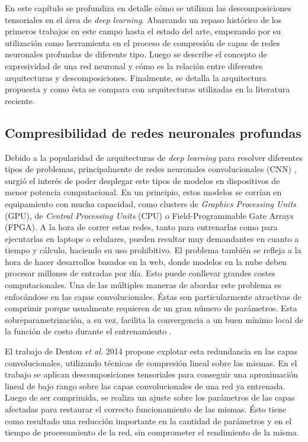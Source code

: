 \documentclass[spanish]{article}
\theoremstyle{definition}
\theoremstyle{remark}
\numberwithin{equation}{section}
\numberwithin{equation}{section} %
\begin{document}
\vspace*{0.25in}
\normalsize En este capítulo se profundiza en detalle cómo se utilizan las descomposiciones tensoriales en el área de \textit{deep learning}. Abarcando un repaso histórico de los primeros trabajos en este campo hasta el estado del arte, empezando por su utilización como herramienta en el proceso de compresión de capas de redes neuronales profundas de diferente tipo. Luego se describe el concepto de expresividad de una red neuronal y cómo es la relación entre diferentes arquitecturas y descomposiciones. Finalmente, se detalla la arquitectura propuesta y como ésta se compara con arquitecturas utilizadas en la literatura reciente.           
\par





\clearpage

\subsection{Compresibilidad de redes neuronales profundas}

Debido a la popularidad de arquitecturas de \textit{deep learning} para resolver diferentes tipos de problemas, principalmente de redes neuronales convolucionales (CNN) \cite{lecun1998gradient}, surgió el interés de poder desplegar este tipos de modelos en dispositivos de menor potencia computacional. En un principio, estos modelos se corrían en equipamiento con mucha capacidad, como clusters de \textit{Graphics Processing Units} (GPU), de \textit{Central Processing Units} (CPU) o  Field-Programmable Gate Arrays (FPGA). A la hora de correr estas redes, tanto para entrenarlas como para ejecutarlas en laptops o celulares, pueden resultar muy demandantes en cuanto a tiempo y cálculo, haciendo su uso prohibitivo. El problema también se refleja a la hora de hacer desarrollos basados en la web, donde modelos en la nube deben procesar millones de entradas por día. Esto puede conllevar grandes costes computacionales. Una de las múltiples maneras de abordar este problema es enfocándose en las capas convolucionales. Éstas son particularmente atractivas de comprimir porque usualmente requieren de un gran número de parámetros. Esta sobreparametrización, a su vez, facilita la convergencia a un buen mínimo local de la función de costo durante el entrenamiento \cite{denil2013predicting}.\par

El trabajo de Denton \textit{et al.} 2014 \cite{denton2014exploiting} propone explotar esta redundancia en las capas convolucionales, utilizando técnicas de compresión lineal sobre las mismas. En el trabajo se aplican descomposiciones tensoriales para conseguir una aproximación lineal de bajo rango sobre las capas convolucionales de una red ya entrenada. Luego de ser comprimida, se realiza un ajuste sobre los parámetros de las capas afectadas para restaurar el correcto funcionamiento de las mismas. Ésto tiene como resultado una reducción importante en la cantidad de parámetros y en el tiempo de procesamiento de la red, sin comprometer el rendimiento de la misma.      
\par
\end{document}
